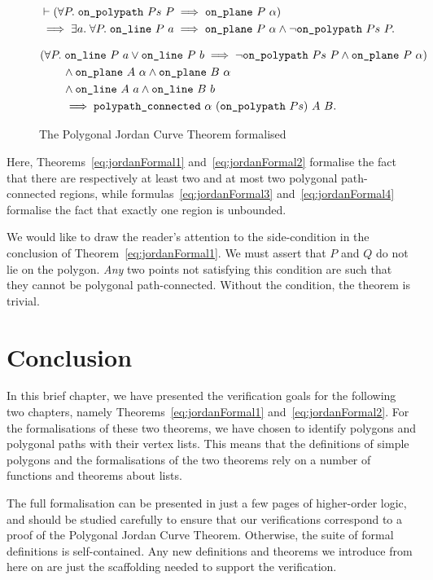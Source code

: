 \begin{figure}
\begin{equation}\label{eq:jordanFormal3}
  \begin{split}
    &\vdash
    (\forall P.\; \code{on\_polypath}\ Ps\ P \implies \code{on\_plane}\ P\ \alpha)
    \\&\implies\exists a.\; \forall P.\; \code{on\_line}\ P\ a \implies \code{on\_plane}\ P\ \alpha\wedge\neg\code{on\_polypath}\ Ps\ P.
    \end{split}
\end{equation}

\begin{equation}\label{eq:jordanFormal4}
  \begin{split}
    &(\forall P.\;\code{on\_line}\ P\ a \vee \code{on\_line}\ P\ b\implies \neg\code{on\_polypath}\ Ps\ P \wedge \code{on\_plane}\ P\ \alpha)\\
    &\qquad\wedge\code{on\_plane}\ A\ \alpha \wedge\code{on\_plane}\ B\ \alpha\\
    &\qquad\wedge\code{on\_line}\ A\ a \wedge\code{on\_line}\ B\ b\\
    &\qquad\implies \code{polypath\_connected}\ \alpha\ (\code{on\_polypath}\ Ps)\ A\ B.
  \end{split}
\end{equation}
\caption{The Polygonal Jordan Curve Theorem formalised}
\label{fig:JCTFormal}
\end{figure}

Here, Theorems~\ref{eq:jordanFormal1} and~\ref{eq:jordanFormal2} formalise the fact that there are respectively at least two and at most two polygonal path-connected regions, while formulas~\ref{eq:jordanFormal3} and~\ref{eq:jordanFormal4} formalise the fact that exactly one region is unbounded.

We would like to draw the reader's attention to the side-condition in the conclusion of Theorem~\ref{eq:jordanFormal1}. We must assert that $P$ and $Q$ do not lie on the polygon. \emph{Any} two points not satisfying this condition are such that they cannot be polygonal path-connected. Without the condition, the theorem is trivial.

\section{Conclusion}
In this brief chapter, we have presented the verification goals for the following two chapters, namely Theorems~\ref{eq:jordanFormal1} and~\ref{eq:jordanFormal2}. For the formalisations of these two theorems, we have chosen to identify polygons and polygonal paths with their vertex lists. This means that the definitions of simple polygons and the formalisations of the two theorems rely on a number of functions and theorems about lists.

The full formalisation can be presented in just a few pages of higher-order logic, and should be studied carefully to ensure that our verifications correspond to a proof of the Polygonal Jordan Curve Theorem. Otherwise, the suite of formal definitions is self-contained. Any new definitions and theorems we introduce from here on are just the scaffolding needed to support the verification.

